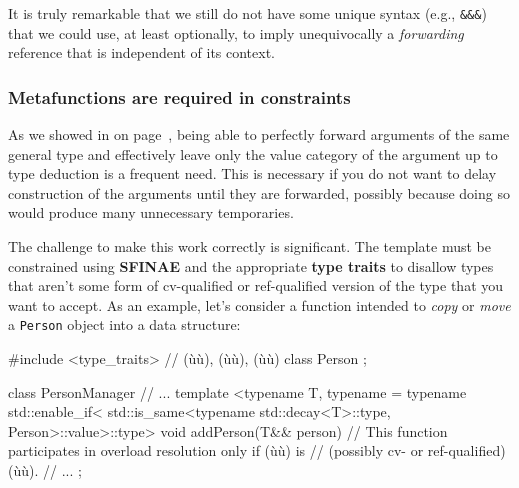 \noindent It is truly remarkable that we still do not have some unique syntax
(e.g., \texttt{\&\&\&}) that we could use, at least optionally, to imply
unequivocally a \emph{forwarding} reference that is independent of its
context.

\subsubsection[Metafunctions are required in constraints]{Metafunctions are required in constraints}\label{metafunctions-are-required-in-constraints}

As we showed in \textit{} on page~\pageref{use-cases-forwardingref}, being able to
perfectly forward arguments of the same general type and effectively
leave only the value category of the argument up to type deduction is a frequent need. This
is necessary if you do not want to delay construction of the arguments
until they are forwarded, possibly because doing so would produce many
unnecessary temporaries.

The challenge to make this work correctly is significant. The template
must be constrained using \textbf{SFINAE} and the appropriate
\textbf{type traits} to disallow types that aren't some form of
cv-qualified or ref-qualified version of the type that you want to
accept. As an example, let's consider a function intended to \emph{copy}
or \emph{move} a \texttt{Person} object into a data structure:

\begin{emcppshiddenlisting}[emcppsbatch=e20]
#include <type_traits>  // (ù{}ù), (ù{}ù), (ù{}ù)
class Person {};
\end{emcppshiddenlisting}
\begin{emcppslisting}[emcppsbatch=e20]
class PersonManager {
// ...
template <typename T, typename = typename std::enable_if<
       std::is_same<typename std::decay<T>::type, Person>::value>::type>
void addPerson(T&& person) {}
    // This function participates in overload resolution only if (ù{}ù) is
    // (possibly cv- or ref-qualified) (ù{}ù).
// ...
};
\end{emcppslisting}

